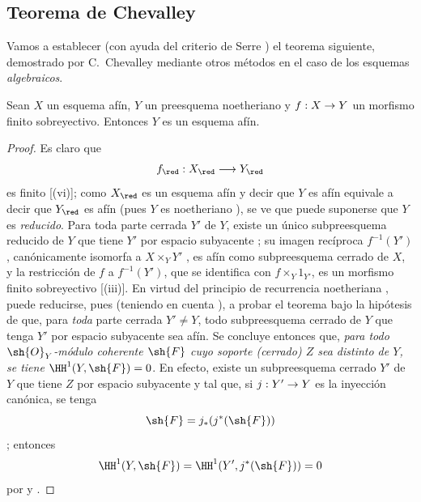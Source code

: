 \documentclass[oneside,10pt]{amsart}
\makeatletter
\newcommand{\ega@arrow}[2]{\mathchoice{#1}{#2}{#2}{#2}}
\renewcommand{\to}{\ega@arrow{\longrightarrow}{\rightarrow}}
\newcommand{\oldpage}[2][]{\marginnote{\normalfont\footnotesize\textbf{#1}~|~#2}\ignorespaces}
\let\EGAOriginalLabel\label
\renewcommand{\label}[1]{\phantomsection\EGAOriginalLabel{#1}}
\makeatother
\begin{document}
\subsection{Teorema de Chevalley}
\label{subsection:II.6.7}

Vamos a establecer (con ayuda del criterio de Serre ) el teorema siguiente, demostrado por C.~Chevalley mediante otros métodos en el caso de los esquemas \emph{algebraicos}.

\oldpage[II]{136}
\begin{theorem}[6.7.1]
\label{II.6.7.1}
Sean $X$ un esquema afín, $Y$ un preesquema noetheriano y $f:X\to Y$ un morfismo finito sobreyectivo.
Entonces $Y$ es un esquema afín.
\end{theorem}

\begin{proof}
Es claro que
\[
  f_\red:X_\red\to Y_\red
\]
es finito [(vi)];
como $X_\red$ es un esquema afín y decir que $Y$ es afín equivale a decir que $Y_\red$ es afín (pues $Y$ es noetheriano ), se ve que puede suponerse que $Y$ es \emph{reducido}.
Para toda parte cerrada $Y'$ de $Y$, existe un único subpreesquema reducido de $Y$ que tiene $Y'$ por espacio subyacente ;
su imagen recíproca $f^{-1}(Y')$, canónicamente isomorfa a $X\times_Y Y'$ , es afín como subpreesquema cerrado de $X$, y la restricción de $f$ a $f^{-1}(Y')$, que se identifica con $f\times_Y1_{Y'}$, es un morfismo finito sobreyectivo [(iii)].
En virtud del principio de recurrencia noetheriana , puede reducirse, pues (teniendo en cuenta ), a probar el teorema bajo la hipótesis de que, para \emph{toda} parte cerrada $Y'\neq Y$, todo subpreesquema cerrado de $Y$ que tenga $Y'$ por espacio subyacente sea afín.
Se concluye entonces que, \emph{para todo $\sh{O}_Y$-módulo coherente $\sh{F}$ cuyo soporte (cerrado) $Z$ sea distinto de $Y$, se tiene $\HH^1(Y,\sh{F})=0$}.
En efecto, existe un subpreesquema cerrado $Y'$ de $Y$ que tiene $Z$ por espacio subyacente y tal que, si $j:Y'\to Y$ es la inyección canónica, se tenga
\[
  \sh{F}=j_*(j^*(\sh{F}))
\]
;
entonces
\[
  \HH^1(Y,\sh{F})=\HH^1(Y',j^*(\sh{F}))=0
\]
por  y .


\end{proof}
\end{document}

